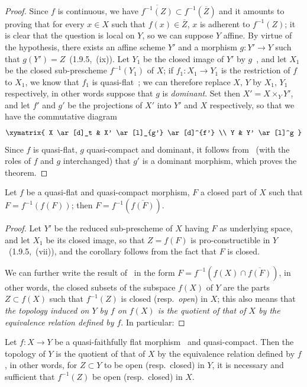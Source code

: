 \begin{proof}
Since $f$ is continuous, we have $\overline{f^{-1}(Z)}\subset f^{-1}(\overline{Z})$ and it amounts to proving that for every $x\in X$ such that $f(x)\in\overline{Z}$, $x$ is adherent to $f^{-1}(Z)$;
it is clear that the question is local on $Y$, so we can suppose $Y$ affine.
By virtue of the hypothesis, there exists an affine scheme $Y'$ and a morphism $g:Y'\to Y$ such that $g(Y')=Z$~(1.9.5,~(ix)).
Let $Y_1$ be the closed image of $Y'$ by $g$~, and let $X_1$ be the closed sub-prescheme $f^{-1}(Y_1)$ of $X$; if $f_1:X_1\to Y_1$ is the restriction of $f$ to $X_1$, we know that $f_1$ is quasi-flat~; we can therefore replace $X$, $Y$ by $X_1$, $Y_1$ respectively, in other words suppose that $g$ is \emph{dominant}.
Set then $X'=X\times_Y Y'$, and let $f'$ and $g'$ be the projections of $X'$ into $Y'$ and $X$ respectively, so that we have the commutative diagram
\[
\xymatrix{
  X \ar[d]_t & X' \ar[l]_{g'} \ar[d]^{f'} \\
  Y & Y' \ar[l]^g
}
\]
Since $f$ is quasi-flat, $g$ quasi-compact and dominant, it follows from~ (with the roles of $f$ and $g$ interchanged) that $g'$ is a dominant morphism, which proves the theorem.
\end{proof}

\begin{corollary}[2.3.11]
\label{IV.2.3.11}
Let $f$ be a quasi-flat and quasi-compact morphism, $F$ a closed part of $X$ such that $F=f^{-1}(f(F))$; then $F=f^{-1}(\overline{f(F)})$.
\end{corollary}

\begin{proof}
Let $Y'$ be the reduced sub-prescheme of $X$ having $F$ as underlying space, and let $X_1$ be its closed image, so that $Z=f(F)$ is pro-constructible in $Y$~(1.9.5,~(vii)), and the corollary follows from the fact that $F$ is closed.

We can further write the result of~ in the form $F=f^{-1}(f(X)\cap\overline{f(F)})$, in other words, the closed subsets of the subspace $f(X)$ of $Y$ are the parts $Z\subset f(X)$ such that $f^{-1}(Z)$ is closed (resp.\ \emph{open}) in $X$; this also means that \emph{the topology induced on $Y$ by $f$ on $f(X)$ is the quotient of that of $X$ by the equivalence relation defined by $f$}.
In particular:
\end{proof}

\begin{corollary}[2.3.12]
\label{IV.2.3.12}
Let $f:X\to Y$ be a quasi-faithfully flat morphism~ and quasi-compact.
Then the topology of $Y$ is the quotient of that of $X$ by the equivalence relation defined by $f$, in other words, for $Z\subset Y$ to be open \textnormal{(}resp.\ closed\textnormal{)} in $Y$, it is necessary and sufficient that $f^{-1}(Z)$ be open \textnormal{(}resp.\ closed\textnormal{)} in $X$.
\end{corollary}

